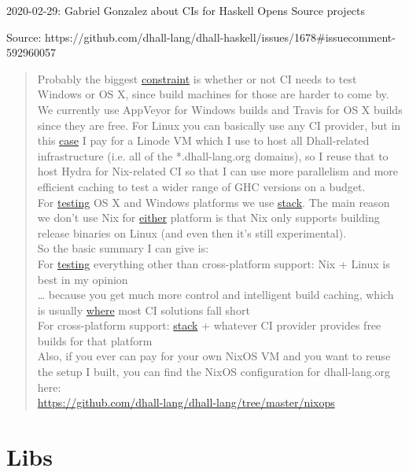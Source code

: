 \documentclass[a4paper,14pt,oneside]{book}
\newcommand{\source}[1]{\caption*{Source: {#1}} }
\begin{document}
\caption{2020-02-29: Gabriel Gonzalez about CIs for Haskell Opens Source projects}
\source{https://github.com/dhall-lang/dhall-haskell/issues/1678#issuecomment-592960057}
\label{quote--gonzales-ci}
\begin{quote}
Probably the biggest \hyperref[org51a2662]{constraint} is whether or not CI needs to test Windows or OS X, since build machines for those are harder to come by. We currently use AppVeyor for Windows builds and Travis for OS X builds since they are free. For Linux you can basically use any CI provider, but in this \hyperref[orgc62adeb]{case} I pay for a Linode VM which I use to host all Dhall-related infrastructure (i.e. all of the *.dhall-lang.org domains), so I reuse that to host Hydra for Nix-related CI so that I can use more parallelism and more efficient caching to test a wider range of GHC versions on a budget.\\

For \hyperref[orge6892ca]{testing} OS X and Windows platforms we use \hyperref[org525b2ca]{stack}. The main reason we don't use Nix for \hyperref[orgb97cd59]{either} platform is that Nix only supports building release binaries on Linux (and even then it's still experimental).\\

So the basic summary I can give is:\\

For \hyperref[orge6892ca]{testing} everything other than cross-platform support: Nix + Linux is best in my opinion\\

\ldots{} because you get much more control and intelligent build caching, which is usually \hyperref[orgf8ef26c]{where} most CI solutions fall short\\

For cross-platform support: \hyperref[org525b2ca]{stack} + whatever CI provider provides free builds for that platform\\

Also, if you ever can pay for your own NixOS VM and you want to reuse the setup I built, you can find the NixOS configuration for dhall-lang.org here:\\

\url{https://github.com/dhall-lang/dhall-lang/tree/master/nixops}\\
\end{quote}

\part{Libs}
\label{sec:orgc34266e}
\end{document}
